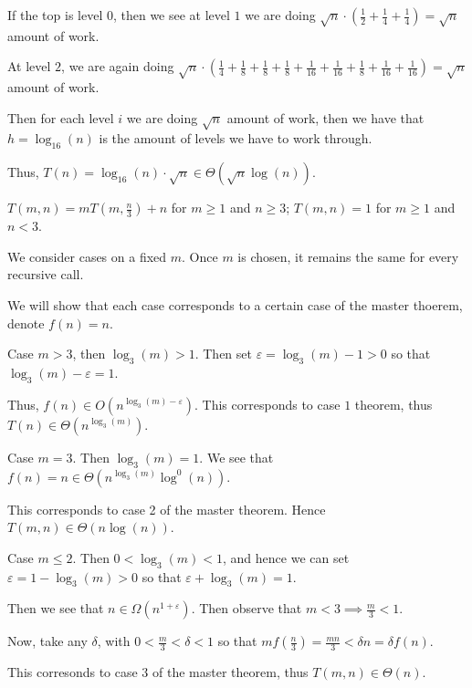 \begin{questions}
\begin{soln}
		If the top is level \(0\), then we see at level \(1\) we are doing \(\sqrt{n} \cdot ( \frac{1}{2} + \frac{1}{4} + \frac{1}{4}) = \sqrt{n}\) amount of work.

		At level \(2\), we are again doing \(\sqrt{n} \cdot (\frac{1}{4} + \frac{1}{8} + \frac{1}{8} + \frac{1}{8} + \frac{1}{16} + \frac{1}{16} + \frac{1}{8} + \frac{1}{16} + \frac{1}{16}) = \sqrt{n}\) amount of work.

		Then for each level \(i\) we are doing \(\sqrt{n}\) amount of work, then we have that \(h = \log_{16}(n)\) is the amount of levels we have to work through.

		Thus, \(T(n) = \log_{16}(n) \cdot \sqrt{n} \in \Theta (\sqrt{n} \log(n))\).
	\end{soln}

	\question[3] $T(m,n) = mT(m, \frac{n}{3}) + n$ for $m \ge 1$ and $n \ge 3$; $T(m,n) = 1$ for $m \ge 1$ and $n < 3$.

	\ifsolutions\fi

	\begin{soln}
		We consider cases on a fixed \(m\). Once \(m\) is chosen, it remains the same for every recursive call.

		We will show that each case corresponds to a certain case of the master thoerem, denote \(f(n) = n\).

		Case \(m > 3\), then \(\log_3(m) > 1\). Then set \(\varepsilon = \log_3(m) - 1 > 0\) so that \(\log_3(m) - \varepsilon = 1\).

		Thus, \(f(n) \in O(n^{\log_3(m) - \varepsilon})\). This corresponds to case \(1\) theorem, thus \(T(n) \in \Theta(n^{\log_3(m)})\).

		Case \(m = 3\). Then \(\log_3(m) = 1\). We see that \(f(n) = n \in \Theta(n^{\log_3(m)} \log^0(n))\).

		This corresponds to case 2 of the master theorem. Hence \(T(m, n) \in \Theta (n \log(n))\).

		Case \(m \leq 2\). Then \(0 < \log_3(m) < 1\), and hence we can set \(\varepsilon = 1 - \log_3(m) > 0\) so that \(\varepsilon + \log_3(m) = 1\).

		Then we see that \(n \in \Omega(n^{1+\varepsilon})\). Then observe that \(m < 3 \implies \frac{m}{3} < 1 \).

		Now, take any \(\delta\), with \(0 < \frac{m}{3} < \delta < 1\) so that \(m f(\frac{n}{3}) = \frac{mn}{3} < \delta n = \delta f(n)\).

		This corresonds to case \(3\) of the master theorem, thus \(T(m, n) \in \Theta (n)\).

	\end{soln}


\end{questions}
